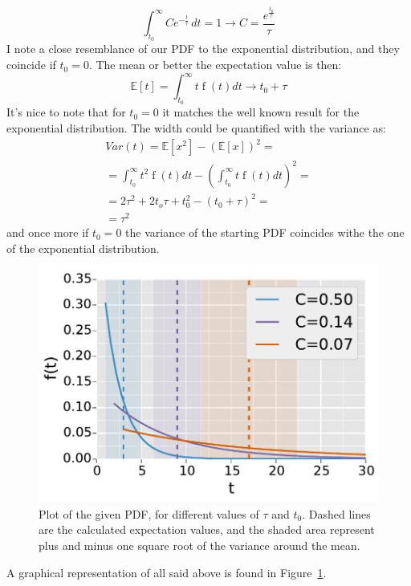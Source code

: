\documentclass[twocolumn]{article}
\begin{document}
	\begin{equation}
		\int_{t_{{0}}}^{\infty} C e^{- \frac{t}{\tau}}\, dt = 1 \longrightarrow C =  \frac{
		e^{
		\frac{t_0}{\tau}
		}}
		{\tau}
	\end{equation}
	I note a close resemblance of our PDF to the exponential distribution, and they coincide if $t_0 = 0$. 
	The mean or better the expectation  value is then:
	\begin{equation}
	\mathbb{E} [t] = \int_{t_0}^{\infty} t \operatorname{f}{(t) d t } \longrightarrow  t_0 + \tau
	\end{equation}
	It's nice to note that for $t_0 = 0$ it matches the well known result for the exponential distribution.
	The width could be quantified with the variance as:
	\begin{multline}
		Var(t) = \mathbb{E}[x^2] - (\mathbb{E}[x])^2 = \\
		= 
		\int_{t_0}^{\infty} t^2 \operatorname{f}{(t) d t } 
		-(\int_{t_0}^{\infty} t \operatorname{f}{(t) d t })^2 = \\
		= 2 \tau ^ 2 + 2 t_o \tau +t_0 ^2  - ( t_0 + \tau ) ^ 2 = \\
		= \tau ^ 2
	\end{multline}
	and once more if $t_0 = 0 $ the variance of the starting PDF coincides withe the one of the exponential distribution. 
	\begin{figure}[htb]
		\begin{center}
			\includegraphics[width= 0.4 \textwidth]{fig/graph.pdf}
		\end{center}
		\caption{Plot of the given PDF, for different values of $ \tau $ and $t_0 $. Dashed lines are the calculated expectation values, and the shaded area represent plus and minus one square root of the variance around the mean.}
		\label{fig:pdf}
	\end{figure}
	A graphical representation of all said above is found in Figure~\ref{fig:pdf}.
\end{document}
